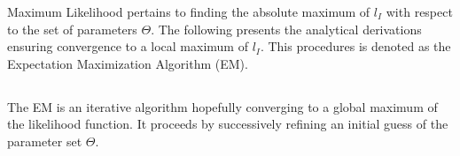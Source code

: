 Maximum Likelihood pertains to finding the absolute maximum of $l_I$ with respect to the set of parameters $\Theta$. The following presents the analytical derivations ensuring convergence to a local maximum of $l_I$. This procedures is denoted as the Expectation Maximization Algorithm (EM).
\subsection{}
The EM is an iterative algorithm hopefully converging to a global maximum of the likelihood function. It proceeds by successively refining an initial guess of the parameter set $\Theta$. 

